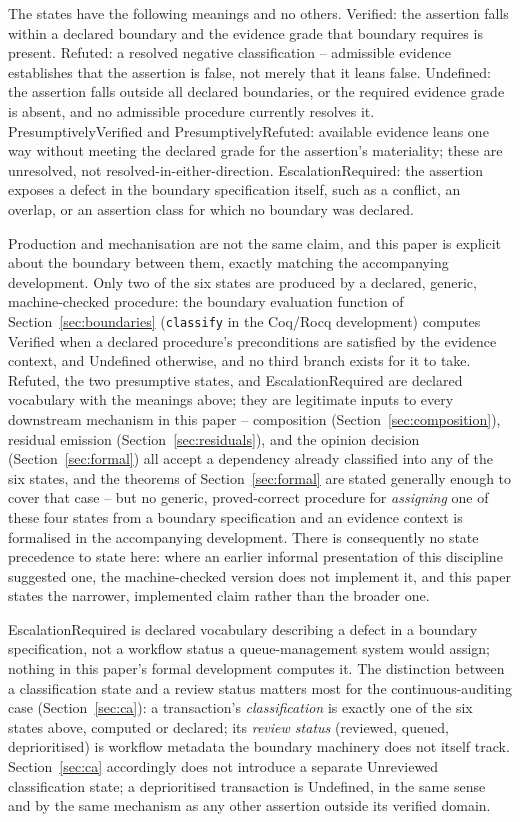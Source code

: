 \documentclass[smallcondensed,envcountsect,natbib]{svjour3}
\newcommand{\state}[1]{\textsf{#1}}
\begin{document}
The states have the following meanings and no others. \state{Verified}: the assertion falls within a declared boundary and the evidence grade that boundary requires is present. \state{Refuted}: a resolved negative classification -- admissible evidence establishes that the assertion is false, not merely that it leans false. \state{Undefined}: the assertion falls outside all declared boundaries, or the required evidence grade is absent, and no admissible procedure currently resolves it. \state{PresumptivelyVerified} and \state{PresumptivelyRefuted}: available evidence leans one way without meeting the declared grade for the assertion's materiality; these are unresolved, not resolved-in-either-direction. \state{EscalationRequired}: the assertion exposes a defect in the boundary specification itself, such as a conflict, an overlap, or an assertion class for which no boundary was declared.

Production and mechanisation are not the same claim, and this paper is explicit about the boundary between them, exactly matching the accompanying development. Only two of the six states are produced by a declared, generic, machine-checked procedure: the boundary evaluation function of Section~\ref{sec:boundaries} (\texttt{classify} in the Coq/Rocq development) computes \state{Verified} when a declared procedure's preconditions are satisfied by the evidence context, and \state{Undefined} otherwise, and no third branch exists for it to take. \state{Refuted}, the two presumptive states, and \state{EscalationRequired} are declared vocabulary with the meanings above; they are legitimate inputs to every downstream mechanism in this paper -- composition (Section~\ref{sec:composition}), residual emission (Section~\ref{sec:residuals}), and the opinion decision (Section~\ref{sec:formal}) all accept a dependency already classified into any of the six states, and the theorems of Section~\ref{sec:formal} are stated generally enough to cover that case -- but no generic, proved-correct procedure for \emph{assigning} one of these four states from a boundary specification and an evidence context is formalised in the accompanying development. There is consequently no state precedence to state here: where an earlier informal presentation of this discipline suggested one, the machine-checked version does not implement it, and this paper states the narrower, implemented claim rather than the broader one.

\state{EscalationRequired} is declared vocabulary describing a defect in a boundary specification, not a workflow status a queue-management system would assign; nothing in this paper's formal development computes it. The distinction between a classification state and a review status matters most for the continuous-auditing case (Section~\ref{sec:ca}): a transaction's \emph{classification} is exactly one of the six states above, computed or declared; its \emph{review status} (reviewed, queued, deprioritised) is workflow metadata the boundary machinery does not itself track. Section~\ref{sec:ca} accordingly does not introduce a separate \state{Unreviewed} classification state; a deprioritised transaction is \state{Undefined}, in the same sense and by the same mechanism as any other assertion outside its verified domain.
\end{document}
